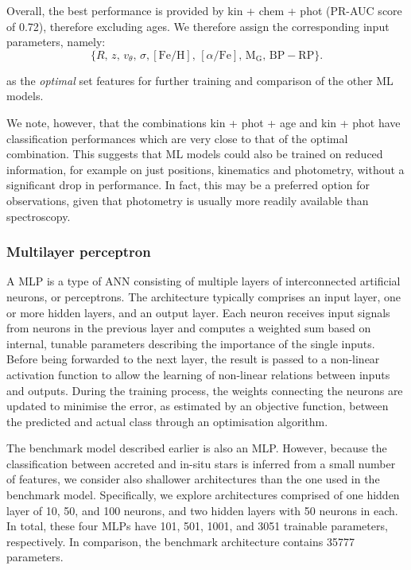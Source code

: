Overall, the best performance is provided by kin + chem + phot (PR-AUC score of 0.72), therefore excluding ages. We therefore assign the corresponding input parameters, namely:
\begin{equation*}
\{R, \, z, \, v_{\theta}, \, \sigma, \mathrm{[Fe/H]}, \, [\alpha/\mathrm{Fe}],  \, \mathrm{M}_{\mathrm{G}}, \, {\mathrm{BP}}-{\mathrm{RP}} \}.
\end{equation*}

\noindent as the \textit{optimal} set features for further training and comparison of the other  ML models.

We note, however, that the combinations kin + phot + age and kin + phot have classification performances which are very close to that of the optimal combination. This suggests that ML models could also be trained on reduced information, for example on just positions, kinematics and photometry, without a significant drop in performance. In fact, this may be a preferred option for observations, given that photometry is usually more readily available than spectroscopy.


\subsubsection{Multilayer perceptron}
\label{subsec:MLP}

A MLP is a type of ANN consisting of multiple layers of interconnected artificial neurons, or perceptrons. The architecture typically comprises an input layer, one or more hidden layers, and an output layer. Each neuron receives input signals from neurons in the previous layer and computes a weighted sum based on internal, tunable parameters describing the importance of the single inputs. Before being forwarded to the next layer, the result is passed to a non-linear activation function to allow the learning of non-linear relations between inputs and outputs. During the training process, the weights connecting the neurons are updated to minimise the error, as estimated by an objective function, between the predicted and actual class through an optimisation algorithm.

The benchmark model described earlier is also an MLP. However, because the classification between accreted and in-situ stars is inferred from a small number of features, we consider also shallower architectures than the one used in the benchmark model.
Specifically, we explore architectures comprised of one hidden layer of 10, 50, and 100 neurons, and two hidden layers with 50 neurons in each. In total, these four MLPs have 101, 501, 1001, and 3051 trainable parameters, respectively. In comparison, the benchmark architecture contains 35777 parameters.

